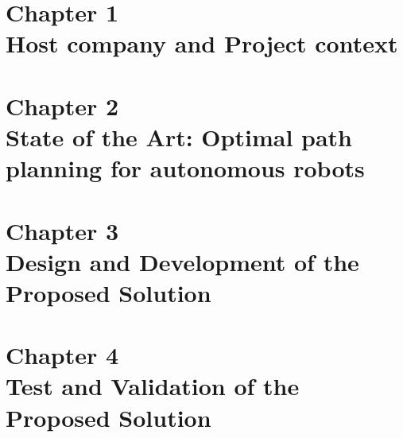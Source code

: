 \documentclass[a4paper,12pt,oneside]{report}
\begin{document}
\onehalfspacing







\tableofcontents
\listoffigures
\listoftables




\pagestyle{fancy}

\newpage
{}



\part*{Chapter 1 \\Host company and Project context}

\part*{Chapter 2 \\State of the Art: Optimal path planning for autonomous robots}

\part*{Chapter 3 \\Design and Development of the
Proposed Solution}

\part*{Chapter 4 \\ Test and Validation of the Proposed Solution}

% 

\fancyhead[R]{}





\newpage

\end{document}
